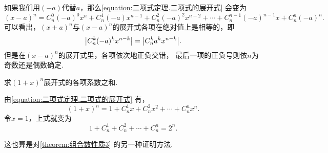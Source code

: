 如果我们用\((-a)\)代替\(a\)，那么\cref{equation:二项式定理.二项式的展开式} 会变为\begin{equation*}
	(x-a)^n = C_n^0 (-a)^0 x^n + C_n^1 (-a) x^{n-1} + C_n^2 (-a)^2 x^{n-2}
	+ \dotsb + C_n^{n-1} (-a)^{n-1} x + C_n^n (-a)^n.
\end{equation*}
可以看出，\((x+a)^n\)与\((x-a)^n\)的展开式各项在绝对值上是相等的，即\begin{equation*}
	\abs{C_n^k (-a)^k x^{n-k}}
	= \abs{C_n^k a^k x^{n-k}}.
\end{equation*}
但是在\((x-a)^n\)的展开式里，各项依次地正负交错，
最后一项的正负号则依\(n\)为奇数还是偶数确定.

\begin{example}
求\((1+x)^n\)展开式的各项系数之和.
\begin{solution}
由\cref{equation:二项式定理.二项式的展开式} 有，\begin{equation*}
	(1+x)^n = 1+C_n^1 x+C_n^2 x^2+\dotsb+C_n^n x^n.
\end{equation*}
令\(x=1\)，上式就变为\begin{equation*}
	1+C_n^1+C_n^2+\dotsb+C_n^n = 2^n.
\end{equation*}
\end{solution}
这也算是对\cref{theorem:组合数性质3} 的另一种证明方法.
\end{example}

